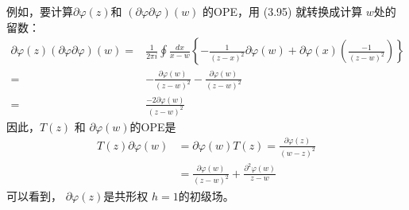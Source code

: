 例如，要计算$ \partial \varphi(z) $和 $(\partial \varphi \partial \varphi)(w)$ 的OPE，用 (3.95) 就转换成计算 $w $处的留数：
\begin{equation}
	\begin{aligned} \partial \varphi(z)(\partial \varphi \partial \varphi)(w)=& \frac{1}{2 \pi i} \oint \frac{d x}{x-w}\left\{-\frac{1}{(z-x)^{2}} \partial \varphi(w)+\partial \varphi(x)\left(\frac{-1}{(z-w)^{2}}\right)\right\} \\ =&-\frac{\partial \varphi(w)}{(z-w)^{2}}-\frac{\partial \varphi(w)}{(z-w)^{2}} \\ =& \frac{-2 \partial \varphi(w)}{(z-w)^{2}} \end{aligned}
\end{equation}
因此，$ T(z)$ 和 $\partial\varphi(w) $的OPE是
\begin{equation}
	\begin{aligned} T(z) \partial \varphi(w) &=\partial \varphi(w) T(z)=\frac{\partial \varphi(z)}{(w-z)^{2}} \\ &=\frac{\partial \varphi(w)}{(z-w)^{2}}+\frac{\partial^{2} \varphi(w)}{z-w} \end{aligned}
\end{equation}
可以看到， $\partial \varphi(z) $是共形权 $h=1 $的初级场。

